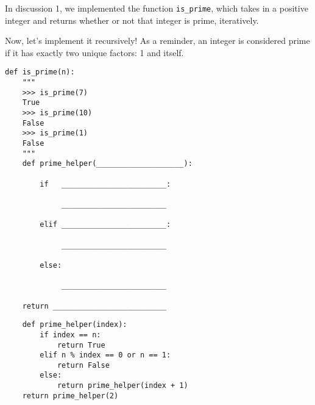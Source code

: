 \question In discussion 1, we implemented the function 
\texttt{is\_prime}, which takes in a positive integer
and returns whether or not that integer is prime, iteratively.

Now, let's implement it recursively! As a reminder, an integer
is considered prime if it has exactly two unique factors: 1 and itself.

\begin{lstlisting}
def is_prime(n):
    """
    >>> is_prime(7)
    True
    >>> is_prime(10)
    False
    >>> is_prime(1)
    False
    """
    def prime_helper(____________________):

        if   ________________________:

             ________________________

        elif ________________________:

             ________________________
        
        else:

             ________________________

    return __________________________
\end{lstlisting}

\begin{blocksection}
\begin{solution}[.5in]
\begin{lstlisting}
    def prime_helper(index):
        if index == n:
            return True
        elif n % index == 0 or n == 1:
            return False
        else:
            return prime_helper(index + 1)
    return prime_helper(2)
\end{lstlisting}
\end{solution}
\end{blocksection}
